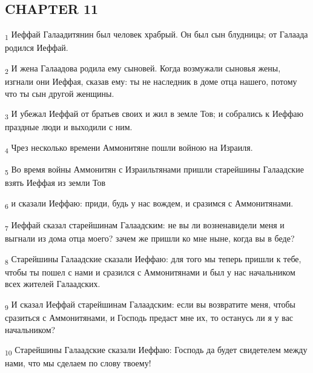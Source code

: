 \subsection{CHAPTER 11}
\begin{tcolorbox}
\textsubscript{1} Иеффай Галаадитянин был человек храбрый. Он был сын блудницы; от Галаада родился Иеффай.
\end{tcolorbox}
\begin{tcolorbox}
\textsubscript{2} И жена Галаадова родила ему сыновей. Когда возмужали сыновья жены, изгнали они Иеффая, сказав ему: ты не наследник в доме отца нашего, потому что ты сын другой женщины.
\end{tcolorbox}
\begin{tcolorbox}
\textsubscript{3} И убежал Иеффай от братьев своих и жил в земле Тов; и собрались к Иеффаю праздные люди и выходили с ним.
\end{tcolorbox}
\begin{tcolorbox}
\textsubscript{4} Чрез несколько времени Аммонитяне пошли войною на Израиля.
\end{tcolorbox}
\begin{tcolorbox}
\textsubscript{5} Во время войны Аммонитян с Израильтянами пришли старейшины Галаадские взять Иеффая из земли Тов
\end{tcolorbox}
\begin{tcolorbox}
\textsubscript{6} и сказали Иеффаю: приди, будь у нас вождем, и сразимся с Аммонитянами.
\end{tcolorbox}
\begin{tcolorbox}
\textsubscript{7} Иеффай сказал старейшинам Галаадским: не вы ли возненавидели меня и выгнали из дома отца моего? зачем же пришли ко мне ныне, когда вы в беде?
\end{tcolorbox}
\begin{tcolorbox}
\textsubscript{8} Старейшины Галаадские сказали Иеффаю: для того мы теперь пришли к тебе, чтобы ты пошел с нами и сразился с Аммонитянами и был у нас начальником всех жителей Галаадских.
\end{tcolorbox}
\begin{tcolorbox}
\textsubscript{9} И сказал Иеффай старейшинам Галаадским: если вы возвратите меня, чтобы сразиться с Аммонитянами, и Господь предаст мне их, то останусь ли я у вас начальником?
\end{tcolorbox}
\begin{tcolorbox}
\textsubscript{10} Старейшины Галаадские сказали Иеффаю: Господь да будет свидетелем между нами, что мы сделаем по слову твоему!
\end{tcolorbox}
